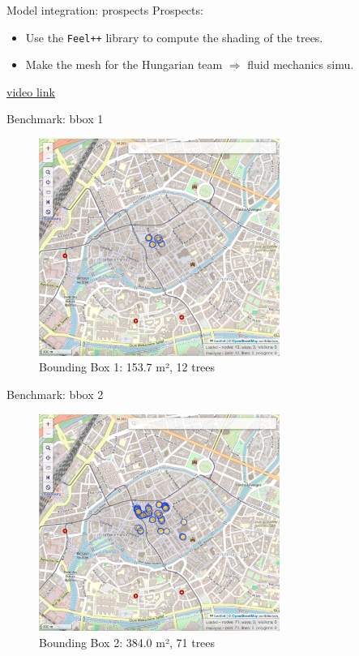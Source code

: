 \documentclass[10pt]{beamer}
\begin{document}
\begin{frame}{Model integration: prospects}
  Prospects: 
  \begin{itemize}
    \item Use the \texttt{Feel++} library to compute the shading of the trees.
    \item Make the mesh for the Hungarian team $\Longrightarrow$ fluid mechanics simu. 
  \end{itemize}
  \href{https://youtu.be/O6flpW6jR60}{video link}
  \begin{center}
\end{center}
\end{frame}

\begin{frame}{Benchmark: bbox 1}
  \begin{figure}[H]
    \centering
    \includegraphics[width=0.7\textwidth]{images/bbox1.png}
    \caption{Bounding Box 1: 153.7 m², 12 trees}
\end{figure}
\end{frame}

\begin{frame}{Benchmark: bbox 2}
  \begin{figure}[H]
    \centering
    \includegraphics[width=0.7\textwidth]{images/bbox2.png}
    \caption{Bounding Box 2: 384.0 m², 71 trees}
\end{figure}
\end{frame}
\end{document}
